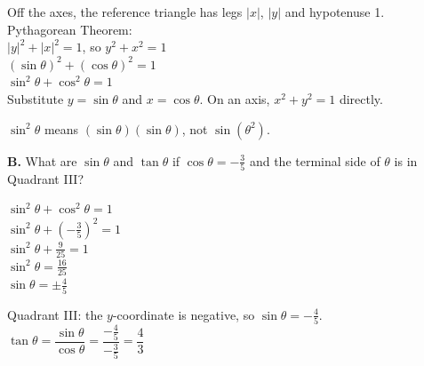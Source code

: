 \begin{minipage}[t]{0.49\textwidth}
\begin{minipage}[t]{0.48\linewidth}
Off the axes, the reference triangle has legs $|x|$, $|y|$ and hypotenuse 1. Pythagorean Theorem:\\[2pt]
$|y|^2+|x|^2=1$, so $y^2+x^2=1$\\[2pt]
$(\sin\theta)^2+(\cos\theta)^2=1$\\[2pt]
$\sin^2\theta+\cos^2\theta=1$\\[2pt]
{\scriptsize Substitute $y=\sin\theta$ and $x=\cos\theta$. On an axis, $x^2+y^2=1$ directly.}
\end{minipage}

\vspace{2pt}
{\scriptsize $\sin^2\theta$ means $(\sin\theta)(\sin\theta)$, not $\sin(\theta^2)$.}
\end{minipage}\hfill
\begin{minipage}[t]{0.49\textwidth}
\vspace{0pt}
\raggedright\textbf{B.} What are $\sin\theta$ and $\tan\theta$ if $\cos\theta=-\frac35$ and the terminal side of $\theta$ is in Quadrant III?\par
\begin{minipage}[t]{0.5\linewidth}\vspace{0pt}
\end{minipage}\hfill
\begin{minipage}[t]{0.48\linewidth}\vspace{2pt}\small
$\sin^2\theta+\cos^2\theta=1$\\[2pt]
$\sin^2\theta+\left(-\frac35\right)^2=1$\\[2pt]
$\sin^2\theta+\frac9{25}=1$\\[2pt]
$\sin^2\theta=\frac{16}{25}$\\[2pt]
$\sin\theta=\pm\frac45$
\end{minipage}

\vspace{2pt}\small
Quadrant III: the $y$-coordinate is negative, so $\sin\theta=-\frac45$.\\[3pt]
$\tan\theta=\dfrac{\sin\theta}{\cos\theta}=\dfrac{-\frac45}{-\frac35}=\dfrac43$
\end{minipage}

